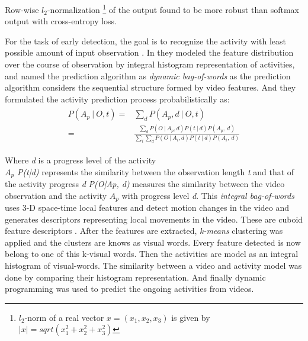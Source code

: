 \newpara Row-wise $\textit{l}_2$-normalization \footnote{$l_2$-norm of a real vector $x=(x_1,x_2,x_3)$ is given by $|x|=sqrt(x_1^2+x_2^2+x_3^2)$} of the output found to be more robust than softmax output with cross-entropy loss. %

For the task of early detection, the goal is to recognize the activity with least possible amount of input observation \cite{ryoo2011human}. In \cite{ryoo2011human} they modeled the feature distribution over the course of observation by integral histogram representation of activities, and named the prediction algorithm as \textit{dynamic bag-of-words} as the prediction algorithm considers the sequential structure formed by video features. And they formulated the activity prediction process probabilistically as:
\begin{align}
\begin{split}
		P(A_{p}\: |\: O,t) ={}& \displaystyle \sum_{d}  P(A_{p},d\: |\: O,t)\\
		={}&	\frac{\sum_{d} P(O\: | \: A_{p},d)P(t\: | \:d)P(A_{p},\: d)}
	 {\sum_{i}\sum_{d} P(O\: | \: A_{i},d)P(t\: | \:d)P(A_{i},\: d) }
\end{split}
\end{align}

\newpara Where \textit{d} is a progress level of the activity \\
\textit{$A_{p}$}  \textit{ P(t|d)} represents the similarity between the observation length \textit{t} and that of the activity progress \textit{d}
\textit{P(O|Ap, d)} measures the similarity between the video observation and the activity \textit{$A_{p}$} with progress level \textit{d}. This \textit{integral bag-of-words} uses 3-D space-time local features and detect motion changes in the video and generates descriptors representing local movements in the video. These are cuboid feature descriptors \cite{dollar2005behavior}. After the features are extracted, \textit{k-means} clustering was applied and the clusters are knows as visual words. Every feature detected is now belong to one of this k-visual words. Then the activities are model as an integral histogram of visual-words. The similarity between a video and activity model was done by comparing their histogram representation. And finally dynamic programming was used to predict the ongoing activities from videos.

